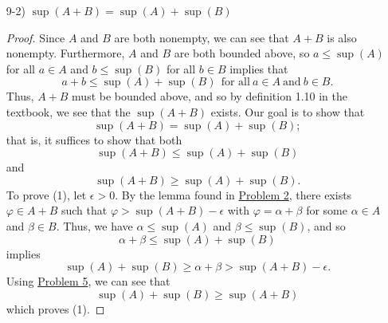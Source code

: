 \documentclass[11pt,a4paper]{article}
\begin{document}
\begin{enumerate}
\begin{enumerate}
\begin{proof}
                To show (2), let \( \epsilon > 0  \) again. Using the same lemma, there exiss \( \varphi \in A +B  \) with \( \varphi = \gamma + \lambda  \) where \( \gamma \in A  \) and \( \lambda \in B  \) such that 
                \[  \gamma + \lambda = \varphi < \inf(A+B) + \epsilon. \]
                Since \( A  \) and \( B  \) are both bounded below, we can see that
                \[ \inf(A) + \inf(B)  \leq   \gamma + \lambda. \]
                Thus, we have
                \[  \inf(A) + \inf(B) \leq \inf(A+B)  \]
                by {\hyperref[Problem 5]{Problem 5}}.
            \end{proof}
        \item[9-2)] \( \sup (A + B) = \sup (A) + \sup (B) \) 

            \begin{proof}
            Since \( A  \) and \( B \) are both nonempty, we can see that \( A + B   \) is also nonempty. Furthermore, \( A  \) and \( B  \) are both bounded above, so \( a \leq \sup (A) \) for all \( a \in A  \) and \( b \leq \sup(B) \) for all \( b \in B  \) implies that 
            \[  a + b \leq \sup(A) + \sup(B) \ \   \text{for all} \  a \in A \  \text{and} \  b \in B.   \]
            Thus, \(  A + B  \) must be bounded above, and so by definition 1.10 in the textbook, we see that the \( \sup(A+B) \) exists. Our goal is to show that  
            \[  \sup (A + B) = \sup(A) + \sup(B); \]
            that is, it suffices to show that both
            \[ \sup(A+B) \leq \sup(A) + \sup(B) \tag{1}  \]
            and
            \[  \sup(A+B) \geq \sup(A) + \sup(B) \tag{2}. \]
            To prove (1), let \( \epsilon > 0  \). By the lemma found in {\hyperref[Problem 2]{Problem 2}}, there exists \( \varphi \in A +  B \) such that \( \varphi > \sup(A+B) - \epsilon \) with \( \varphi = \alpha + \beta  \) for some \( \alpha \in A  \) and \( \beta \in B  \). Thus, we have \( \alpha \leq \sup(A) \) and \( \beta \leq \sup(B) \), and so        
            \[  \alpha + \beta \leq \sup(A) + \sup(B) \]
            implies
            \[  \sup(A) + \sup(B) \geq \alpha + \beta > \sup(A+B) - \epsilon. \]
            Using {\hyperref[Problem 5]{Problem 5}}, we can see that  
            \[  \sup(A) + \sup(B) \geq \sup(A+B) \]
            which proves (1).


\end{proof}
\end{enumerate}
\end{enumerate}
\end{document}
